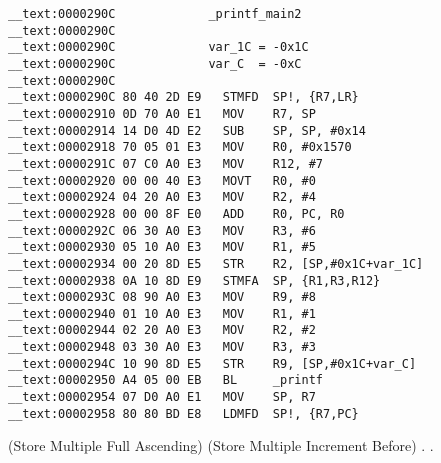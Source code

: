 \begin{lstlisting}
__text:0000290C             _printf_main2
__text:0000290C
__text:0000290C             var_1C = -0x1C
__text:0000290C             var_C  = -0xC
__text:0000290C
__text:0000290C 80 40 2D E9   STMFD  SP!, {R7,LR}
__text:00002910 0D 70 A0 E1   MOV    R7, SP
__text:00002914 14 D0 4D E2   SUB    SP, SP, #0x14
__text:00002918 70 05 01 E3   MOV    R0, #0x1570
__text:0000291C 07 C0 A0 E3   MOV    R12, #7
__text:00002920 00 00 40 E3   MOVT   R0, #0
__text:00002924 04 20 A0 E3   MOV    R2, #4
__text:00002928 00 00 8F E0   ADD    R0, PC, R0
__text:0000292C 06 30 A0 E3   MOV    R3, #6
__text:00002930 05 10 A0 E3   MOV    R1, #5
__text:00002934 00 20 8D E5   STR    R2, [SP,#0x1C+var_1C]
__text:00002938 0A 10 8D E9   STMFA  SP, {R1,R3,R12}
__text:0000293C 08 90 A0 E3   MOV    R9, #8
__text:00002940 01 10 A0 E3   MOV    R1, #1
__text:00002944 02 20 A0 E3   MOV    R2, #2
__text:00002948 03 30 A0 E3   MOV    R3, #3
__text:0000294C 10 90 8D E5   STR    R9, [SP,#0x1C+var_C]
__text:00002950 A4 05 00 EB   BL     _printf
__text:00002954 07 D0 A0 E1   MOV    SP, R7
__text:00002958 80 80 BD E8   LDMFD  SP!, {R7,PC}
\end{lstlisting}

  (Store Multiple Full Ascending) 
 (Store Multiple Increment Before) . 
.

